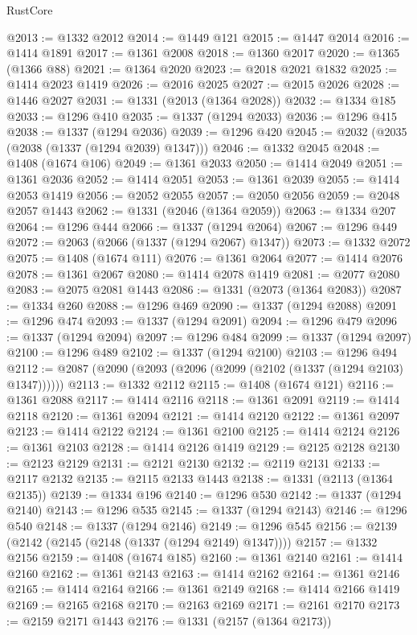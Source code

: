\begin{lexlean}{RustCore}
\begin{coremodule}
@2013 := @1332 @2012
@2014 := @1449 @121
@2015 := @1447 @2014
@2016 := @1414 @1891
@2017 := @1361 @2008
@2018 := @1360 @2017
@2020 := @1365 (@1366 @88)
@2021 := @1364 @2020
@2023 := @2018 @2021 @1832
@2025 := @1414 @2023 @1419
@2026 := @2016 @2025
@2027 := @2015 @2026
@2028 := @1446 @2027
@2031 := @1331 (@2013 (@1364 @2028))
@2032 := @1334 @185
@2033 := @1296 @410
@2035 := @1337 (@1294 @2033)
@2036 := @1296 @415
@2038 := @1337 (@1294 @2036)
@2039 := @1296 @420
@2045 := @2032 (@2035 (@2038 (@1337 (@1294 @2039) @1347)))
@2046 := @1332 @2045
@2048 := @1408 (@1674 @106)
@2049 := @1361 @2033
@2050 := @1414 @2049
@2051 := @1361 @2036
@2052 := @1414 @2051
@2053 := @1361 @2039
@2055 := @1414 @2053 @1419
@2056 := @2052 @2055
@2057 := @2050 @2056
@2059 := @2048 @2057 @1443
@2062 := @1331 (@2046 (@1364 @2059))
@2063 := @1334 @207
@2064 := @1296 @444
@2066 := @1337 (@1294 @2064)
@2067 := @1296 @449
@2072 := @2063 (@2066 (@1337 (@1294 @2067) @1347))
@2073 := @1332 @2072
@2075 := @1408 (@1674 @111)
@2076 := @1361 @2064
@2077 := @1414 @2076
@2078 := @1361 @2067
@2080 := @1414 @2078 @1419
@2081 := @2077 @2080
@2083 := @2075 @2081 @1443
@2086 := @1331 (@2073 (@1364 @2083))
@2087 := @1334 @260
@2088 := @1296 @469
@2090 := @1337 (@1294 @2088)
@2091 := @1296 @474
@2093 := @1337 (@1294 @2091)
@2094 := @1296 @479
@2096 := @1337 (@1294 @2094)
@2097 := @1296 @484
@2099 := @1337 (@1294 @2097)
@2100 := @1296 @489
@2102 := @1337 (@1294 @2100)
@2103 := @1296 @494
@2112 := @2087 (@2090 (@2093 (@2096 (@2099 (@2102 (@1337 (@1294 @2103) @1347))))))
@2113 := @1332 @2112
@2115 := @1408 (@1674 @121)
@2116 := @1361 @2088
@2117 := @1414 @2116
@2118 := @1361 @2091
@2119 := @1414 @2118
@2120 := @1361 @2094
@2121 := @1414 @2120
@2122 := @1361 @2097
@2123 := @1414 @2122
@2124 := @1361 @2100
@2125 := @1414 @2124
@2126 := @1361 @2103
@2128 := @1414 @2126 @1419
@2129 := @2125 @2128
@2130 := @2123 @2129
@2131 := @2121 @2130
@2132 := @2119 @2131
@2133 := @2117 @2132
@2135 := @2115 @2133 @1443
@2138 := @1331 (@2113 (@1364 @2135))
@2139 := @1334 @196
@2140 := @1296 @530
@2142 := @1337 (@1294 @2140)
@2143 := @1296 @535
@2145 := @1337 (@1294 @2143)
@2146 := @1296 @540
@2148 := @1337 (@1294 @2146)
@2149 := @1296 @545
@2156 := @2139 (@2142 (@2145 (@2148 (@1337 (@1294 @2149) @1347))))
@2157 := @1332 @2156
@2159 := @1408 (@1674 @185)
@2160 := @1361 @2140
@2161 := @1414 @2160
@2162 := @1361 @2143
@2163 := @1414 @2162
@2164 := @1361 @2146
@2165 := @1414 @2164
@2166 := @1361 @2149
@2168 := @1414 @2166 @1419
@2169 := @2165 @2168
@2170 := @2163 @2169
@2171 := @2161 @2170
@2173 := @2159 @2171 @1443
@2176 := @1331 (@2157 (@1364 @2173))

\end{coremodule}
\end{lexlean}
